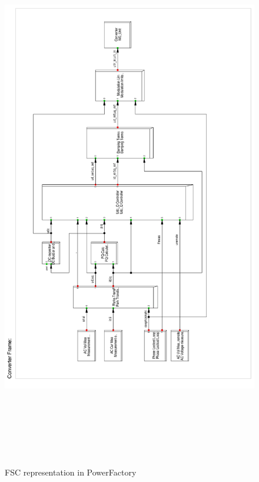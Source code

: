 \begin{figure}[H]
\centering
    \includegraphics[height = 24cm,width = \textwidth]{Diagrams/Appendix_A/FSC_PFD.pdf}
    \caption{FSC representation in PowerFactory \cite{erlich_description_nodate}}
    \label{fig:FSC_PFD}
\end{figure}

